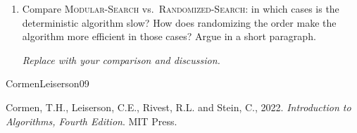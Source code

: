 \documentclass[dvipsnames]{article}
\begin{document}
\begin{problem}
\begin{enumerate}
\begin{enumerate}[(a)]
\color{purple}
\begin{mdframed}
  \color{purple}
  \emph{Replace with your pseudocode for \textsc{Randomized-Search}.}
\end{mdframed}

\color{black}\noindent
        \item Derive the \textbf{expected running time}, in terms of \(n\) and \(k\),
        for \textbf{any} fixed input array that contains exactly \(k\) copies of \(x\).

\color{purple}
\begin{mdframed}
  \color{purple}
  \emph{Replace with your expected-time analysis for \textsc{Randomized-Search}.}
\end{mdframed}

      \end{enumerate}

\color{black}\noindent
    \item Compare \textsc{Modular-Search} vs.\ \textsc{Randomized-Search}: in which cases is the deterministic algorithm slow?
    How does randomizing the order make the algorithm more efficient in those cases? Argue in a short paragraph.

\color{purple}
\begin{mdframed}
  \color{purple}
  \emph{Replace with your comparison and discussion.}
\end{mdframed}

  \end{enumerate}
\end{problem}

\begin{thebibliography}{CormenLeiserson09}

Cormen, T.H., Leiserson, C.E., Rivest, R.L. and Stein, C., 2022. \emph{Introduction to Algorithms, Fourth Edition}. MIT Press.

\end{thebibliography}
\end{document}
